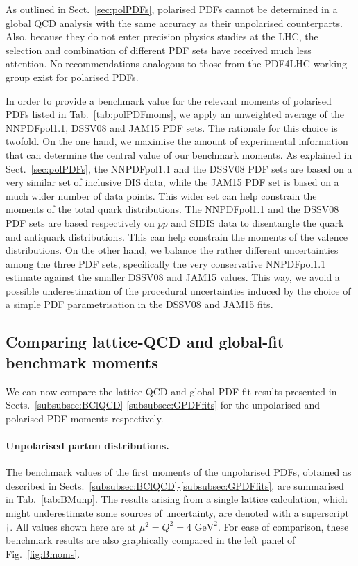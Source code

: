 As outlined in Sect.~\ref{sec:polPDFs}, polarised PDFs cannot be determined in a 
global QCD analysis with the same accuracy as their unpolarised counterparts.
%
Also, because they do not enter precision physics studies at the LHC, the
selection and combination of different PDF sets have received much less
attention.
%
No recommendations analogous to those from the PDF4LHC working group
exist for polarised PDFs.

In order to provide a benchmark value for the relevant moments of 
polarised PDFs listed in Tab.~\ref{tab:polPDFmoms}, we apply an unweighted 
average of the NNPDFpol1.1, DSSV08 and JAM15 PDF sets.
%
The rationale for this choice is twofold.
%
On the one hand, we maximise the amount of experimental information 
that can determine the central value of our benchmark moments.
%
As explained in Sect.~\ref{sec:polPDFs}, the NNPDFpol1.1 and the DSSV08 PDF 
sets are based on a very similar set of inclusive DIS data, while the JAM15 
PDF set is based on a much wider number of data points.
%
This wider set can help constrain the moments of the total quark 
distributions.
%
The NNPDFpol1.1 and the DSSV08 PDF sets are based respectively on $pp$ and 
SIDIS data to disentangle the quark and antiquark distributions.
%
This can help constrain the moments of the valence distributions.
%
On the other hand, we balance the rather different uncertainties among the 
three PDF sets, specifically the very conservative NNPDFpol1.1 estimate
against the smaller DSSV08 and JAM15 values.
%
This way, we avoid a possible underestimation of the procedural
uncertainties induced by the choice of a simple PDF parametrisation 
in the DSSV08 and JAM15 fits.

\subsection{Comparing lattice-QCD and global-fit benchmark moments}
\label{subsec:BN}

We can now compare the lattice-QCD and global PDF fit results presented in 
Sects.~\ref{subsubsec:BClQCD}-\ref{subsubsec:GPDFfits} for the unpolarised
and polarised PDF moments respectively.

\paragraph{Unpolarised parton distributions.}
%
The benchmark values of the first moments of the unpolarised PDFs, obtained
as described in Sects.~\ref{subsubsec:BClQCD}-\ref{subsubsec:GPDFfits}, 
are summarised in Tab.~\ref{tab:BMunp}.
%
The results arising from a single lattice calculation, which might underestimate some 
sources of uncertainty, are denoted with a superscript~$\dagger$.
%
All values shown here are at $\mu^2=Q^2=4\mbox{ GeV}^2$.
%
For ease of comparison, these benchmark results are also graphically
compared in the left panel of Fig.~\ref{fig:Bmoms}.

